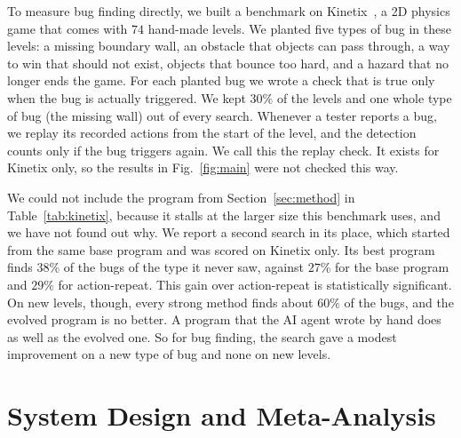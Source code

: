 \documentclass{article}
\begin{document}
To measure bug finding directly, we built a benchmark on Kinetix~\citep{kinetix}, a 2D physics game that comes with
$74$ hand-made levels. We planted five types of bug in these levels: a missing boundary wall, an obstacle that objects can pass through, a way to win that should not exist, objects that bounce too
hard, and a hazard that no longer ends the game. For each planted bug we wrote a check that is true only when the bug is
actually triggered. We kept $30\%$ of the levels and one whole type of bug (the missing wall) out of every search.
Whenever a tester reports a bug, we replay its recorded actions from the start of the level, and the detection counts
only if the bug triggers again. We call this the replay check. It exists for Kinetix only, so the results in
Fig.~\ref{fig:main} were not checked this way.

We could not include the program from Section~\ref{sec:method} in Table~\ref{tab:kinetix}, because it stalls at the
larger size this benchmark uses, and we have not found out why. We report a second search in its place, which started
from the same base program and was scored on Kinetix only. Its best program finds $38\%$ of the bugs of the type it
never saw, against $27\%$ for the base program and $29\%$ for action-repeat. This gain over
action-repeat is statistically significant. On new levels, though, every strong method finds about $60\%$ of the bugs,
and the evolved program is no better. A program that the AI agent wrote by hand does as well as the evolved one. So for
bug finding, the search gave a modest improvement on a new type of bug and none on new levels.

\section{System Design and Meta-Analysis}
\end{document}
